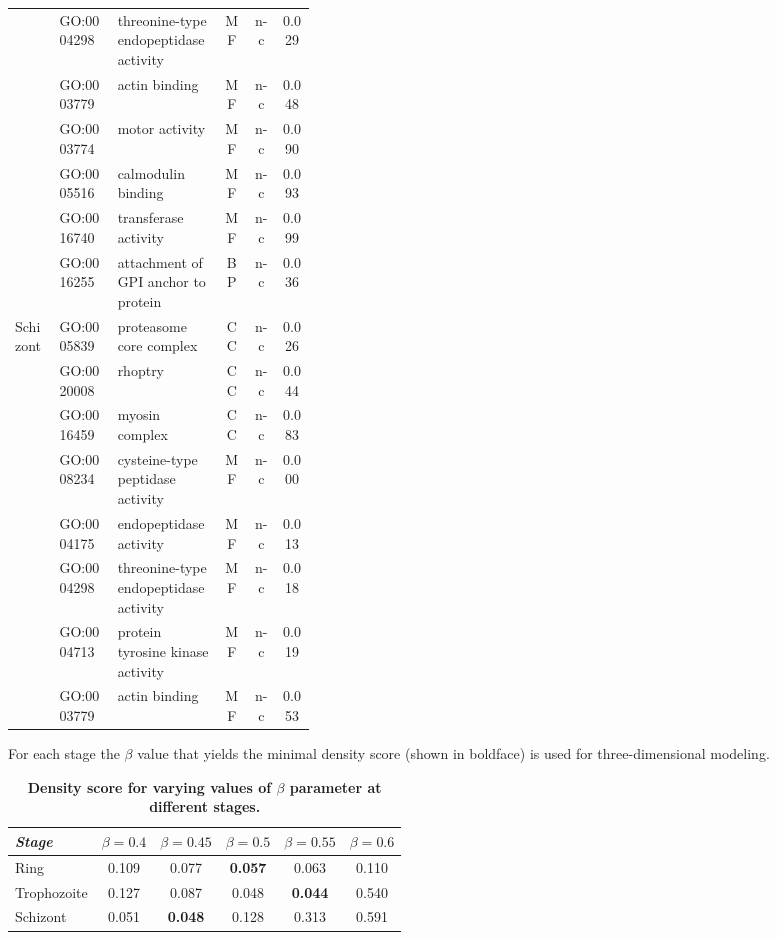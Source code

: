 \begin{table}
\begin{center}
\begin{tabular}{llp{0.35\linewidth}ccc}
& GO:0004298 & threonine-type endopeptidase activity & MF  & n-c & 0.029\\
& GO:0003779 & actin binding & MF  & n-c & 0.048\\
& GO:0003774 & motor activity & MF  & n-c & 0.090\\
& GO:0005516 & calmodulin binding & MF  & n-c & 0.093\\
& GO:0016740 & transferase activity & MF  & n-c & 0.099\\
& GO:0016255 & attachment of GPI anchor to protein & BP & n-c & 0.036\\
\hline
\multirow{8}{*}{Schizont}
& GO:0005839 & proteasome core complex & CC & n-c & 0.026\\
& GO:0020008 & rhoptry & CC & n-c & 0.044\\
& GO:0016459 & myosin complex & CC & n-c & 0.083\\
& GO:0008234 & cysteine-type peptidase activity & MF  & n-c & 0.000\\
& GO:0004175 & endopeptidase activity & MF  & n-c & 0.013\\
& GO:0004298 & threonine-type endopeptidase activity & MF  & n-c & 0.018\\
& GO:0004713 & protein tyrosine kinase activity & MF  & n-c & 0.019\\
& GO:0003779 & actin binding & MF  & n-c & 0.053\\
\hline
\end{tabular}
\end{center}
\label{table:secondPro}
\end{table}
\clearpage

\begin{table}
\caption{{\bf Density score for varying values of $\beta$ parameter at different stages.}}
{For each stage the $\beta$ value that yields the minimal density score (shown in boldface)
is used for three-dimensional modeling.}
\vspace{10pt}
\begin{center}
\begin{tabular}{lccccc}
\hline
\emph{Stage} & $\beta = 0.4$ & $\beta = 0.45$ & $\beta = 0.5$ & $\beta = 0.55$ &
$\beta = 0.6$ \\
\hline
Ring & 0.109 & 0.077 & \textbf{0.057} & 0.063 & 0.110 \\
Trophozoite & 0.127 & 0.087 & 0.048 & \textbf{0.044} & 0.540 \\
Schizont & 0.051 & \textbf{0.048} & 0.128 & 0.313 & 0.591 \\\hline
\end{tabular}
\end{center}
\label{table:density}
\end{table}
\clearpage




